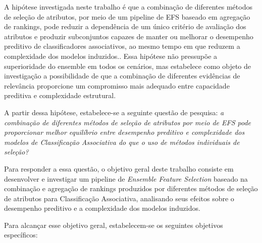 A hipótese investigada neste trabalho é que a combinação de
diferentes métodos de seleção de atributos, por meio de um pipeline
de EFS baseado em agregação de rankings, pode reduzir a dependência
de um único critério de avaliação dos atributos e produzir subconjuntos
capazes de manter ou melhorar o desempenho preditivo de classificadores
associativos, ao mesmo tempo em que reduzem a complexidade dos modelos
induzidos.. Essa hipótese não pressupõe a superioridade do ensemble em todos os cenários, mas estabelece como objeto de investigação a possibilidade de que a combinação de diferentes evidências de relevância proporcione um compromisso mais adequado entre capacidade preditiva e complexidade estrutural.

A partir dessa hipótese, estabelece-se a seguinte questão de pesquisa: \textit{a combinação de diferentes métodos de seleção de atributos por meio de EFS pode proporcionar melhor equilíbrio entre desempenho preditivo e complexidade dos modelos de Classificação Associativa do que o uso de métodos individuais de seleção?}

Para responder a essa questão, o objetivo geral deste trabalho consiste em desenvolver e investigar um pipeline de \textit{Ensemble Feature Selection} baseado na combinação e agregação de rankings produzidos por diferentes métodos de seleção de atributos para Classificação Associativa, analisando seus efeitos sobre o desempenho preditivo e a complexidade dos modelos induzidos.

Para alcançar esse objetivo geral, estabelecem-se os seguintes
objetivos específicos:

